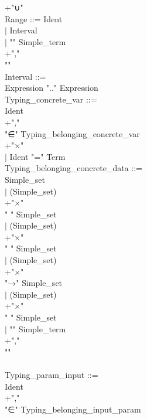 \documentclass[12pt,a4paper,draft]{report}
\begin{document}
{\begin{sloppypar}
+"∪"\\ 
Range ::= Ident \\ 
\hspace*{0.20in} $|$  Interval\\ 
\hspace*{0.20in} $|$ "{" Simple\_term\\ 
+","\\ 
 "}"\\ 
Interval ::= \\ 
   Expression  ".."  Expression\\ 
Typing\_concrete\_var ::= \\ 
  Ident\\ 
+","\\ 
  "∈"  Typing\_belonging\_concrete\_var\\ 
+"$\times$"\\ 
\hspace*{0.20in} $|$ Ident  "="  Term\\ 
Typing\_belonging\_concrete\_data ::= \\ 
   Simple\_set\\ 
\hspace*{0.20in} $|$ (Simple\_set)\\ 
+"$\times$"\\ 
  " "  Simple\_set  \\ 
\hspace*{0.20in} $|$ (Simple\_set)\\ 
+"$\times$"\\ 
  " "  Simple\_set  \\ 
\hspace*{0.20in} $|$ (Simple\_set)\\ 
+"$\times$"\\ 
  "→"  Simple\_set  \\ 
\hspace*{0.20in} $|$ (Simple\_set)\\ 
+"$\times$"\\ 
  " "  Simple\_set  \\ 
\hspace*{0.20in} $|$ "{" Simple\_term\\ 
+","\\ 
 "}"\\ 
 \\ 
 Typing\_param\_input ::= \\ 
  Ident\\ 
+","\\ 
  "∈"  Typing\_belonging\_input\_param\\ 

\end{sloppypar}}
\end{document}
